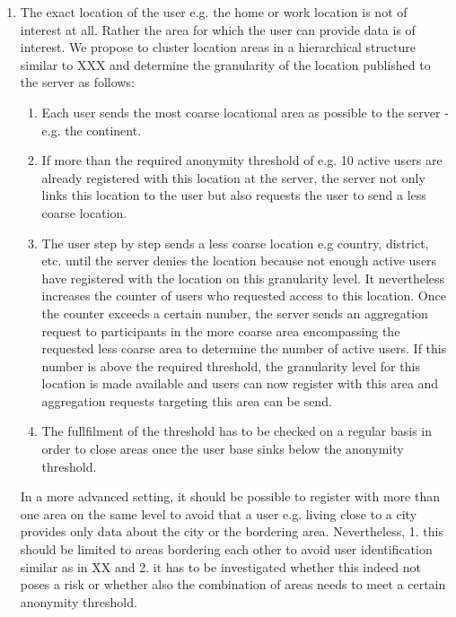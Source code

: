  \begin{enumerate}
 	\item The exact location of the user e.g. the home or work location is not of interest at all. Rather the area for which the user can provide data is of interest. We propose to cluster location areas in a hierarchical structure similar to XXX and determine the granularity of the location published to the server as follows:
 	\begin{enumerate}
 		\item Each user sends the most coarse locational area as possible to the server - e.g. the continent.
 		\item If more than the required anonymity threshold of e.g. 10 active users are already registered with this location at the server, the server not only links this location to the user but also requests the user to send a less coarse location.
 		\item The user step by step sends a less coarse location e.g country, district, etc. until the server denies the location because not enough active users have registered with the location on this granularity level. It nevertheless increases the counter of users who requested access to this location. Once the counter exceeds a certain number, the server sends an aggregation request to participants in the more coarse area encompassing the requested less coarse area to determine the number of active users. If this number is above the required threshold, the granularity level for this location is made available and users can now register with this area and aggregation requests targeting this area can be send.
 		\item The fullfilment of the threshold has to be checked on a regular basis in order to close areas once the user base sinks below the anonymity threshold.
 	\end{enumerate}
 	In a more advanced setting, it should be possible to register with more than one area on the same level to avoid that a user e.g. living close to a city provides only data about the city or the bordering area. Nevertheless, 1. this should be limited to areas bordering each other to avoid user identification similar as in XX and 2. it has to be investigated whether this indeed not poses a risk or whether also the combination of areas needs to meet a certain anonymity threshold.
 \end{enumerate}

